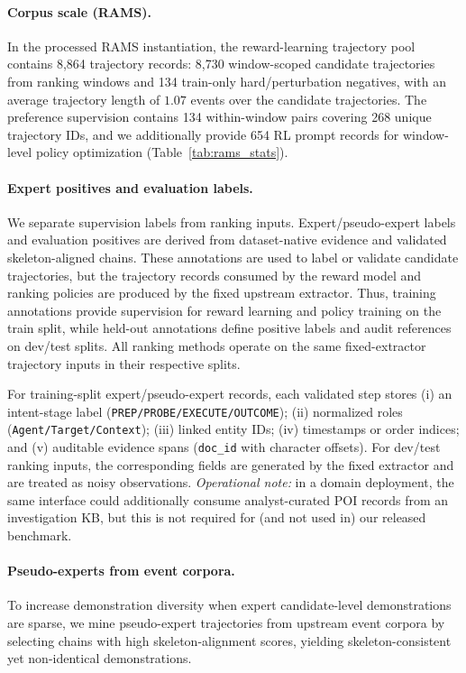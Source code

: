 \documentclass{article}
\begin{document}
\paragraph{Corpus scale (RAMS).}
In the processed RAMS instantiation, the reward-learning trajectory pool contains 8,864 trajectory records: 8,730 window-scoped candidate trajectories from ranking windows and 134 train-only hard/perturbation negatives, with an average trajectory length of $1.07$ events over the candidate trajectories.
The preference supervision contains 134 within-window pairs covering 268 unique trajectory IDs, and we additionally provide 654 RL prompt records for window-level policy optimization (Table~\ref{tab:rams_stats}).

\paragraph{Expert positives and evaluation labels.}
We separate supervision labels from ranking inputs.
Expert/pseudo-expert labels and evaluation positives are derived from dataset-native evidence and validated skeleton-aligned chains.
These annotations are used to label or validate candidate trajectories, but the trajectory records consumed by the reward model and ranking policies are produced by the fixed upstream extractor.
Thus, training annotations provide supervision for reward learning and policy training on the train split, while held-out annotations define positive labels and audit references on dev/test splits.
All ranking methods operate on the same fixed-extractor trajectory inputs in their respective splits.

For training-split expert/pseudo-expert records, each validated step stores
(i) an intent-stage label (\texttt{PREP/PROBE/EXECUTE/OUTCOME});
(ii) normalized roles (\texttt{Agent/Target/Context});
(iii) linked entity IDs;
(iv) timestamps or order indices; and
(v) auditable evidence spans (\texttt{doc\_id} with character offsets).
For dev/test ranking inputs, the corresponding fields are generated by the fixed extractor and are treated as noisy observations.
\emph{Operational note:} in a domain deployment, the same interface could additionally consume analyst-curated POI records from an investigation KB, but this is not required for (and not used in) our released benchmark.

\paragraph{Pseudo-experts from event corpora.}
To increase demonstration diversity when expert candidate-level demonstrations are sparse, we mine pseudo-expert trajectories from upstream event corpora by selecting chains with high skeleton-alignment scores, yielding skeleton-consistent yet non-identical demonstrations.
\end{document}
